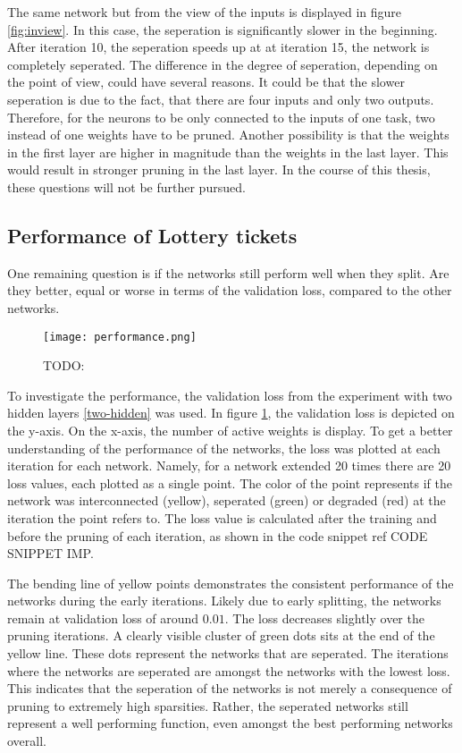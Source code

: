 The same network but from the view of the inputs is displayed in figure \ref{fig:inview}.
In this case, the seperation is significantly slower in the beginning.
After iteration 10, the seperation speeds up at at iteration 15, the network is completely seperated.
The difference in the degree of seperation, depending on the point of view, could have several reasons.
It could be that the slower seperation is due to the fact, that there are four inputs and only two outputs.
Therefore, for the neurons to be only connected to the inputs of one task, two instead of one weights have to be pruned.
Another possibility is that the weights in the first layer are higher in magnitude than the weights in the last layer.
This would result in stronger pruning in the last layer.
In the course of this thesis, these questions will not be further pursued.



\subsection{Performance of Lottery tickets}
One remaining question is if the networks still perform well when they split.
Are they better, equal or worse in terms of the validation loss, compared to the other networks.

\begin{figure}[ht]
    \centering
    \texttt{[image: performance.png]}
    \caption{TODO:}
    \label{fig:performance}
\end{figure}

To investigate the performance, the validation loss from the experiment with two hidden layers \ref{two-hidden} was used.
In figure \ref{fig:performance}, the validation loss is depicted on the y-axis.
On the x-axis, the number of active weights is display.
To get a better understanding of the performance of the networks, the loss was plotted at each iteration for each network.
Namely, for a network extended 20 times there are 20 loss values, each plotted as a single point.
The color of the point represents if the network was interconnected (yellow), seperated (green) or degraded (red) at the iteration the point refers to.
The loss value is calculated after the training and before the pruning of each iteration, as shown in the code snippet ref CODE SNIPPET IMP.

The bending line of yellow points demonstrates the consistent performance of the networks during the early iterations.
Likely due to early splitting, the networks remain at validation loss of around $0.01$.
The loss decreases slightly over the pruning iterations.
A clearly visible cluster of green dots sits at the end of the yellow line.
These dots represent the networks that are seperated.
The iterations where the networks are seperated are amongst the networks with the lowest loss.
This indicates that the seperation of the networks is not merely a consequence of pruning to extremely high sparsities.
Rather, the seperated networks still represent a well performing function, even amongst the best performing networks overall.

